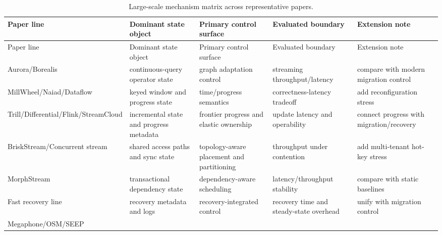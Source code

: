 \documentclass[acmsmall,screen,review]{acmart}
\begin{document}
\setlength{\tabcolsep}{1.5pt}
\scriptsize
\begin{longtable}{>{\raggedright\arraybackslash}p{}>{\raggedright\arraybackslash}p{}>{\raggedright\arraybackslash}p{}>{\raggedright\arraybackslash}p{}>{\raggedright\arraybackslash}p{}}
\caption{Large-scale mechanism matrix across representative papers.}\label{tab:large-matrix-a}\\
\toprule
Paper line & Dominant state object & Primary control surface & Evaluated boundary & Extension note \\
\midrule
\endfirsthead
\toprule
Paper line & Dominant state object & Primary control surface & Evaluated boundary & Extension note \\
\midrule
\endhead
Aurora/Borealis~\cite{abadi2003aurora,abadi2005borealis} & continuous-query operator state & graph adaptation control & streaming throughput/latency & compare with modern migration control \\
MillWheel/Naiad/\newline Dataflow \newline \cite{akidau2013millwheel,murray2013naiad,akidau2015dataflow} & keyed window and progress state & time/progress semantics & correctness-latency tradeoff & add reconfiguration stress \\
Trill/Differential/\newline Flink/StreamCloud \newline \cite{chandramouli2014trill,murray2013differential,carbone2015flink,gulisano2012streamcloud} & incremental state and progress metadata & frontier progress and elastic ownership & update latency and operability & connect progress with migration/recovery \\
BriskStream/\newline Concurrent stream~\cite{zhang2019briskstream,zhang2020concurrent} & shared access paths and sync state & topology-aware placement and partitioning & throughput under contention & add multi-tenant hot-key stress \\
MorphStream~\cite{mao2023morphstream} & transactional dependency state & dependency-aware scheduling & latency/throughput stability & compare with static baselines \\
Fast recovery line~\cite{zhao2024recovery} & recovery metadata and logs & recovery-integrated control & recovery time and steady-state overhead & unify with migration control \\
Megaphone/\newline OSM/SEEP \\

\end{longtable}
\end{document}
